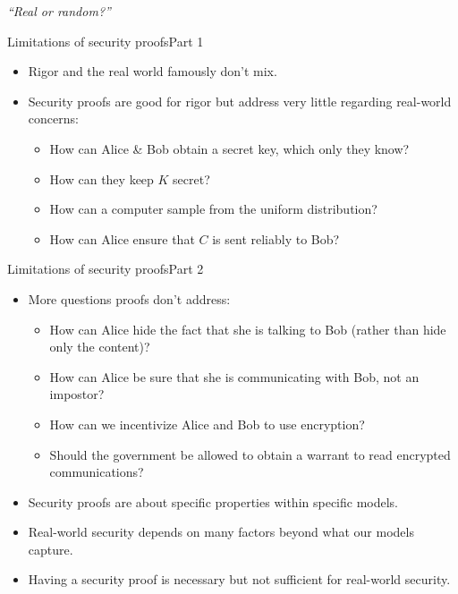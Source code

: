 \documentclass[aspectratio=169, lualatex, handout]{beamer}
\begin{document}
\begin{frame}
	\begin{center}
		\huge \textit{``Real or random?''}
	\end{center}
\end{frame}

\begin{frame}{Limitations of security proofs}{Part 1}
	\begin{itemize}[<+->]
		\item Rigor and the real world famously don't mix.
		\item Security proofs are good for rigor but address very little regarding real-world concerns:
		      \begin{itemize}[<+->]
			      \item How can Alice \& Bob obtain a secret key, which only they know?
			      \item How can they keep $K$ secret?
			      \item How can a computer sample from the uniform distribution?
			      \item How can Alice ensure that $C$ is sent reliably to Bob?
		      \end{itemize}
	\end{itemize}
\end{frame}

\begin{frame}{Limitations of security proofs}{Part 2}
	\begin{itemize}[<+->]
		\item More questions proofs don't address:
		      \begin{itemize}[<+->]
			      \item How can Alice hide the fact that she is talking to Bob (rather than hide only the content)?
			      \item How can Alice be sure that she is communicating with Bob, not an impostor?
			      \item How can we incentivize Alice and Bob to use encryption?
			      \item Should the government be allowed to obtain a warrant to read encrypted communications?
		      \end{itemize}
		\item Security proofs are about specific properties within specific models.
		\item Real-world security depends on many factors beyond what our models capture.
		\item Having a security proof is necessary but not sufficient for real-world security.
	\end{itemize}
\end{frame}
\end{document}
